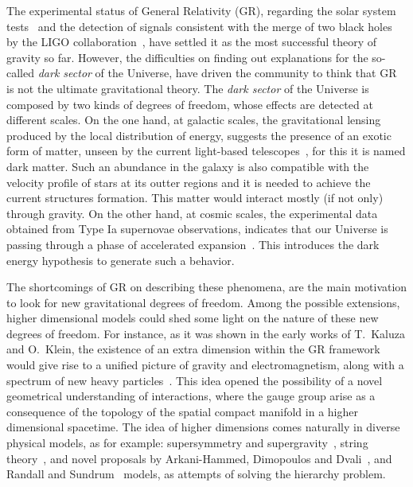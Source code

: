 \documentclass[aps,prd,12pt,superscriptaddress,showpacs,showkeys,longbibliography,reprint,nofootinbib]{revtex4-1}
\begin{document}
The experimental status of General Relativity (GR), regarding the solar system tests~\cite{Will:2014kxa} and the detection of signals consistent with the merge of two black holes by the LIGO collaboration~\cite{Abbott:2016blz,*Abbott:2016nmj}, have settled it as the most successful theory of gravity so far. However, the difficulties on finding out explanations for the so-called \emph{dark sector} of the Universe, have driven the community to think that GR is not the ultimate gravitational theory. The \emph{dark sector} of the Universe is composed by two kinds of degrees of freedom, whose effects are detected at different scales. On the one hand, at galactic scales, the gravitational lensing produced by the local distribution of energy, suggests the presence of an exotic form of matter, unseen by the current light-based telescopes~\cite{Sofue:2000jx}, for this it is named dark matter. Such an abundance in the galaxy is also compatible with the velocity profile of stars at its outter regions and it is needed to achieve the current structures formation. This matter would interact mostly (if not only) through gravity. On the other hand, at cosmic scales, the experimental data obtained from Type Ia supernovae observations, indicates that our Universe is passing through a phase of accelerated expansion~\cite{Riess:1998cb}. This introduces the dark energy hypothesis to generate such a behavior. 

The shortcomings of GR on describing these phenomena, are the main motivation to look for new gravitational degrees of freedom. Among the possible extensions, higher dimensional models could shed some light on the nature of these new degrees of freedom. For instance, as it was shown in the early works of T.~Kaluza and O.~Klein, the existence of an extra dimension within the GR framework would give rise to a unified picture of gravity and electromagnetism, along with a spectrum of new heavy particles~\cite{Kaluza:1921tu,*Klein:1926tv}. This idea opened the possibility of a novel geometrical understanding of interactions, where the gauge group arise as a consequence of the topology of the spatial compact manifold in a higher dimensional spacetime. The idea of higher dimensions comes naturally in diverse physical models, as for example: supersymmetry and supergravity~\cite{supergravity}, string theory~\cite{Green:1987sp,*Green:1987mn}, and novel proposals by Arkani-Hammed, Dimopoulos and Dvali~\cite{ArkaniHamed:1998rs,*Antoniadis:1998ig}, and Randall and Sundrum~\cite{Randall:1999ee,*Randall:1999vf} models, as attempts of solving the hierarchy problem.
\end{document}
